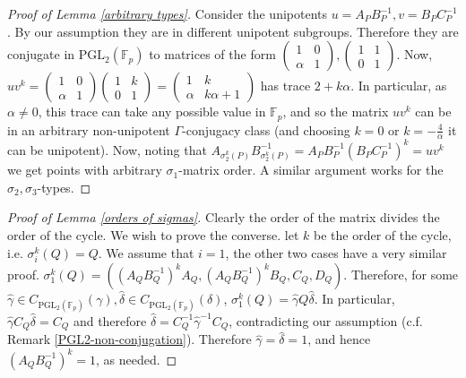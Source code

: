 \documentclass[letterpaper]{amsart}
\begin{document}
\begin{proof}[Proof of Lemma \ref{arbitrary types}]
    Consider the unipotents $u = A_PB_P^{-1},v = B_PC_P^{-1}$. By our assumption they are in different unipotent subgroups. Therefore they are conjugate in $\mathrm{PGL}_2(\mathbb{F}_p)$ to matrices of the form $\begin{pmatrix}1 & 0 \\ \alpha & 1\end{pmatrix}, \begin{pmatrix}1 & 1 \\ 0 &  1\end{pmatrix}$. Now, $uv^k=\begin{pmatrix}1 & 0 \\ \alpha & 1\end{pmatrix}\begin{pmatrix}1 & k \\ 0 &  1\end{pmatrix}=\begin{pmatrix}1 & k \\ \alpha & k\alpha + 1\end{pmatrix}$ has trace $2 + k\alpha$. In particular, as $\alpha \neq 0$, this trace can take any possible value in $\mathbb{F}_p$, and so the matrix $uv^k$ can be in an arbitrary non-unipotent $\Gamma$-conjugacy class (and choosing $k = 0$ or $k = -\frac{4}{\alpha}$ it can be unipotent). Now, noting that $A_{\sigma_2^k(P)}B_{\sigma_2^k(P)}^{-1} = A_PB_P^{-1} (B_PC_P^{-1})^k = uv^k$ we get points with arbitrary $\sigma_1$-matrix order.
    A similar argument works for the $\sigma_2,\sigma_3$-types.
\end{proof}
\begin{proof}[Proof of Lemma \ref{orders of sigmas}]
Clearly the order of the matrix divides the order of the cycle. We wish to prove the converse. let $k$ be the order of the cycle, i.e. $\sigma_i^k(Q) = Q$.
We assume that $i = 1$, the other two cases have a very similar proof.
$\sigma_1^k(Q) = ((A_QB_Q^{-1})^kA_Q,(A_QB_Q^{-1})^kB_Q,C_Q,D_Q)$. Therefore, for some $\hat{\gamma}\in C_{\mathrm{PGL}_2(\mathbb{F}_p)}(\gamma),\hat{\delta}\in C_{\mathrm{PGL}_2(\mathbb{F}_p)}(\delta)$, $\sigma_1^k(Q) = \hat{\gamma}Q\hat{\delta}$. In particular, $\hat{\gamma}C_Q\hat{\delta} = C_Q$ and therefore $\hat{\delta} = C_Q^{-1}\hat{\gamma}^{-1}C_Q$, contradicting our assumption (c.f. Remark \ref{PGL2-non-conjugation}). Therefore $\hat{\gamma}=\hat{\delta} = 1$, and hence $(A_QB_Q^{-1})^k = 1$, as needed.
\end{proof}
\end{document}
